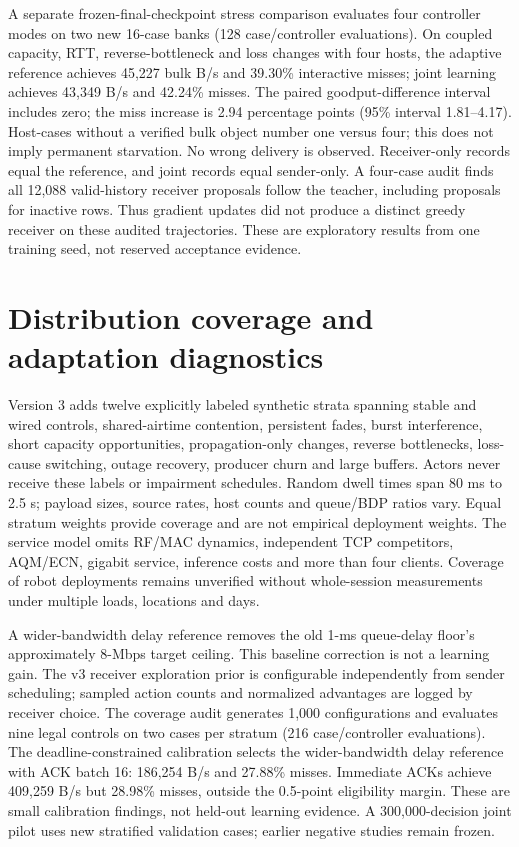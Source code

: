 \documentclass[11pt]{article}
\begin{document}
A separate frozen-final-checkpoint stress comparison evaluates four controller
modes on two new 16-case banks (128 case/controller evaluations). On coupled
capacity, RTT, reverse-bottleneck and loss changes with four hosts, the adaptive
reference achieves 45,227 bulk B/s and 39.30\% interactive misses; joint learning
achieves 43,349 B/s and 42.24\% misses. The paired goodput-difference interval
includes zero; the miss increase is 2.94 percentage points (95\% interval
1.81--4.17). Host-cases without a verified bulk object number one versus four;
this does not imply permanent starvation. No wrong delivery is observed.
Receiver-only records equal the reference, and joint records equal sender-only.
A four-case audit finds all 12,088 valid-history receiver proposals follow the
teacher, including proposals for inactive rows. Thus gradient updates did not
produce a distinct greedy receiver on these audited trajectories. These are
exploratory results from one training seed, not reserved acceptance evidence.

\section{Distribution coverage and adaptation diagnostics}
Version 3 adds twelve explicitly labeled synthetic strata spanning stable and
wired controls, shared-airtime contention, persistent fades, burst interference,
short capacity opportunities, propagation-only changes, reverse bottlenecks,
loss-cause switching, outage recovery, producer churn and large buffers. Actors
never receive these labels or impairment schedules. Random dwell times span
80 ms to 2.5 s; payload sizes, source rates, host counts and queue/BDP ratios vary.
Equal stratum weights provide coverage and are not empirical deployment weights.
The service model omits RF/MAC dynamics, independent TCP competitors, AQM/ECN,
gigabit service, inference costs and more than four clients. Coverage of robot
deployments remains unverified without whole-session measurements under multiple
loads, locations and days.

A wider-bandwidth delay reference removes the old 1-ms queue-delay floor's
approximately 8-Mbps target ceiling. This baseline correction is not a learning
gain. The v3 receiver exploration prior is configurable independently from sender
scheduling; sampled action counts and normalized advantages are logged by receiver
choice. The coverage audit generates 1,000 configurations and evaluates nine legal
controls on two cases per stratum (216 case/controller evaluations). The
deadline-constrained calibration selects the wider-bandwidth delay reference
with ACK batch 16: 186,254 B/s and 27.88\% misses. Immediate ACKs achieve
409,259 B/s but 28.98\% misses, outside the 0.5-point eligibility margin.
These are small calibration findings, not held-out learning evidence. A
300,000-decision joint pilot uses new stratified validation cases; earlier
negative studies remain frozen.
\end{document}
